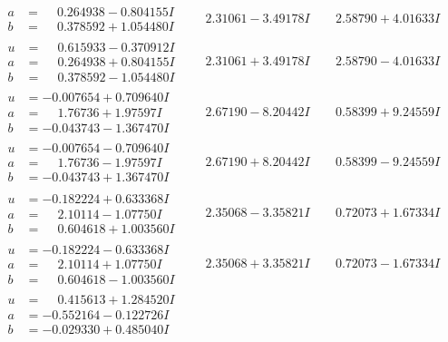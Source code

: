 \documentclass[1p]{elsarticle_modified}
\theoremstyle{definition}
\begin{document}
$$\begin{array}{c|c|c}
\begin{aligned}
a &= \phantom{-}0.264938 - 0.804155 I \\
b &= \phantom{-}0.378592 + 1.054480 I\end{aligned}
 & \phantom{-}2.31061 - 3.49178 I & \phantom{-}2.58790 + 4.01633 I \\ \hline\begin{aligned}
u &= \phantom{-}0.615933 - 0.370912 I \\
a &= \phantom{-}0.264938 + 0.804155 I \\
b &= \phantom{-}0.378592 - 1.054480 I\end{aligned}
 & \phantom{-}2.31061 + 3.49178 I & \phantom{-}2.58790 - 4.01633 I \\ \hline\begin{aligned}
u &= -0.007654 + 0.709640 I \\
a &= \phantom{-}1.76736 + 1.97597 I \\
b &= -0.043743 - 1.367470 I\end{aligned}
 & \phantom{-}2.67190 - 8.20442 I & \phantom{-}0.58399 + 9.24559 I \\ \hline\begin{aligned}
u &= -0.007654 - 0.709640 I \\
a &= \phantom{-}1.76736 - 1.97597 I \\
b &= -0.043743 + 1.367470 I\end{aligned}
 & \phantom{-}2.67190 + 8.20442 I & \phantom{-}0.58399 - 9.24559 I \\ \hline\begin{aligned}
u &= -0.182224 + 0.633368 I \\
a &= \phantom{-}2.10114 - 1.07750 I \\
b &= \phantom{-}0.604618 + 1.003560 I\end{aligned}
 & \phantom{-}2.35068 - 3.35821 I & \phantom{-}0.72073 + 1.67334 I \\ \hline\begin{aligned}
u &= -0.182224 - 0.633368 I \\
a &= \phantom{-}2.10114 + 1.07750 I \\
b &= \phantom{-}0.604618 - 1.003560 I\end{aligned}
 & \phantom{-}2.35068 + 3.35821 I & \phantom{-}0.72073 - 1.67334 I \\ \hline\begin{aligned}
u &= \phantom{-}0.415613 + 1.284520 I \\
a &= -0.552164 - 0.122726 I \\
b &= -0.029330 + 0.485040 I\end{aligned}

\end{array}$$
\end{document}
